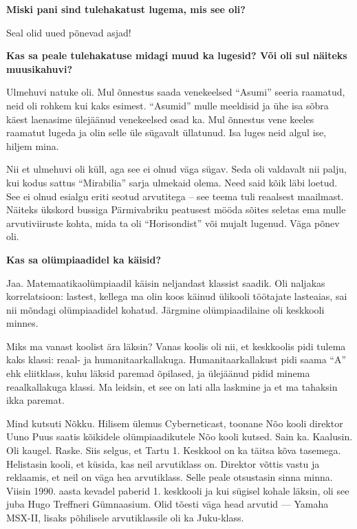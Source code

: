\textbf{Miski pani sind tulehakatust lugema, mis see oli?}

Seal olid uued põnevad asjad!

\textbf{Kas sa peale tulehakatuse midagi muud ka lugesid? Või oli sul
näiteks muusikahuvi?}

Ulmehuvi natuke oli. Mul õnnestus saada venekeelsed \enquote{Asumi} seeria raamatud, neid
oli rohkem kui kaks esimest. \enquote{Asumid} mulle meeldisid ja ühe isa sõbra käest
laenasime ülejäänud venekeelsed osad ka. Mul õnnestus vene keeles
raamatut lugeda ja olin selle üle sügavalt üllatunud. Isa luges neid algul
ise, hiljem mina. 

Nii et ulmehuvi oli küll, aga see ei olnud väga sügav. Seda
oli valdavalt nii palju, kui kodus sattus \enquote{Mirabilia} sarja ulmekaid olema. Need
said kõik läbi loetud. See ei olnud esialgu eriti seotud arvutitega -- see teema tuli reaalsest maailmast. Näiteks ükskord
bussiga Pärmivabriku peatusest mööda sõites seletas ema mulle arvutiviiruste
kohta, mida ta oli \enquote{Horisondist} või mujalt lugenud.
Väga põnev oli. 

\textbf{Kas sa olümpiaadidel ka käisid?}

Jaa. Matemaatikaolümpiaadil käisin neljandast klassist saadik. Oli
naljakas korrelatsioon: lastest, kellega ma olin koos käinud ülikooli töötajate
lasteaias, sai nii mõndagi olümpiaadidel kohatud. Järgmine
olümpiaadilaine oli keskkooli minnes.

Miks ma vanast koolist ära läksin? Vanas koolis oli nii, et keskkoolis pidi
tulema kaks klassi: reaal- ja humanitaarkallakuga. 
Humanitaarkallakust pidi saama \enquote{A} ehk eliitklass, kuhu läksid paremad
õpilased, ja ülejäänud pidid minema reaalkallakuga klassi. Ma
leidsin, et see on lati alla laskmine ja et ma tahaksin ikka paremat. 

Mind kutsuti Nõkku. Hilisem ülemus
Cyberneticast, toonane Nõo kooli direktor Uuno
Puus saatis kõikidele olümpiaadikutele Nõo kooli
kutsed. Sain ka. Kaalusin. Oli kaugel. Raske. Siis selgus, et Tartu 1. Keskkool on ka täitsa kõva tasemega. Helistasin
kooli, et küsida, kas neil arvutiklass on. Direktor võttis vastu ja
reklaamis, et neil on väga hea arvutiklass. Selle peale otsustasin sinna
minna. Viisin 1990. aasta kevadel paberid 1. keskkooli ja kui sügisel
kohale läksin, oli see juba Hugo Treffneri Gümnaasium. Olid tõesti väga head arvutid
--- Yamaha MSX-II, lisaks põhilisele arvutiklassile oli ka
Juku-klass.

